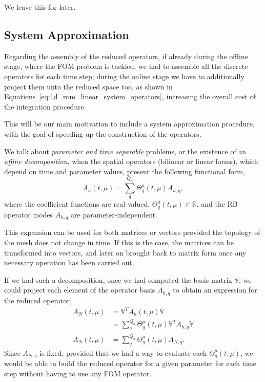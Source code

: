 \documentclass[../../1_heat_equation.tex]{subfiles}
\newcommand{\rbV}{\ensuremath{\mathbb{V}}}
\newcommand{\rbVT}{\ensuremath{\rbV^T}}
\begin{document}
We leave this for later.

\subsection{System Approximation}
\label{sec:1d_rom_heat_equation_system_approximation_deim}
Regarding the assembly of the reduced operators, if already during the offline stage, where the FOM problem is tackled, we had to assemble all the discrete operators for each time step;
during the online stage we have to additionally project them unto the reduced space too, as shown in Equations~\eqref{eq:1d_rom_linear_system_operators},
increasing the overall cost of the integration procedure.

This will be our main motivation to include a system approximation procedure,
with the goal of speeding up the construction of the operators.

We talk about \emph{parameter and time separable} problems, or the existence of an \emph{affine decomposition},
when the spatial operators (bilinear or linear forms), which depend on time and parameter values, present the following functional form,
\begin{equation}
    \label{eq:1d_rom_heat_equation_separable_form_time_param}
    A_h(t, \mu) = \sum_q^{Q_a} \Theta_q^a(t, \mu) A_{h,q},
\end{equation}
where the coefficient functions are real-valued, \mbox{$\Theta_q^a(t, \mu) \in \mathbb{R}$}, 
and the RB operator modes $A_{h,q}$ are parameter-independent.

This expansion can be used for both matrices or vectors provided the topology of the mesh does not change in time.
If this is the case, the matrices can be transformed into vectors, and later on brought back to matrix form once any necessary operation has been carried out.

If we had such a decomposition, once we had computed the basis matrix \rbV, we could project each element of the operator basis $A_{h, q}$ to obtain an expression for the reduced operator, 
\begin{equation}
    \begin{split}
        A_N(t, \mu) &= \rbVT A_h(t, \mu) \rbV \\ 
        &= \sum_q^{Q_a} \Theta_q^a(t, \mu) \rbVT  A_{h, q} \rbV \\
        A_N(t, \mu) &= \sum_q^{Q_a} \Theta_q^a(t, \mu) A_{N,q}.
    \end{split}
\end{equation}
Since $A_{N, q}$ is fixed, provided that we had a way to evaluate each $\Theta_q^a(t, \mu)$, we would be able to build the reduced operator for a given parameter for each time step without having to use any FOM operator. 
\end{document}

